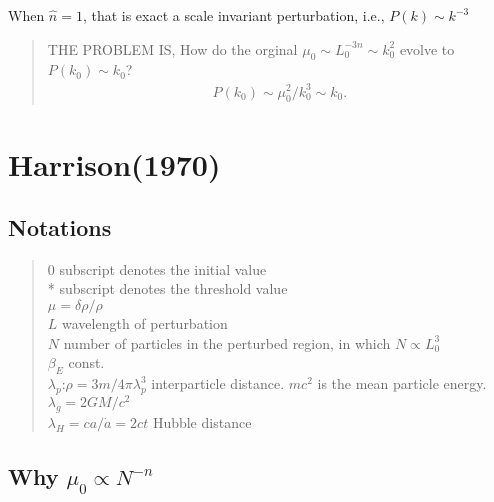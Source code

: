 \documentclass{article}
\begin{document}
When $\hat{n}=1$, that is exact a scale invariant perturbation, i.e., $P(k)\sim k^{-3}$


\begin{quote}
THE PROBLEM IS, How do the orginal $\mu_0\sim L_0^{-3n}\sim k_0^2$ evolve to $P(k_0)\sim k_0$?
\begin{eqnarray}
P(k_0)\sim \mu_0^2/k_0^3 \sim k_0.
\end{eqnarray}
\end{quote}




















\iffalse


\section{Harrison(1970)}



\setcounter{section}{0}


\subsection{Notations} 

\begin{quote}
0 subscript denotes the initial value \\
* subscript denotes the threshold value \\
$\mu=\delta\rho/\rho$ \\
$L$ wavelength of perturbation  \\
$N$  number of particles in the perturbed region, in which $N\propto L_0^3$  \\
$\beta_E$ const. \\
$\lambda_p$:$\rho=3m/4\pi\lambda_p^3$ interparticle distance. $mc^2$ is the mean particle energy. \\
$\lambda_g=2GM/c^2$   \\
$\lambda_H=ca/\dot a=2ct$  Hubble distance
\end{quote}



\subsection{Why $\mu_0\propto N^{-n}$}
\end{document}
